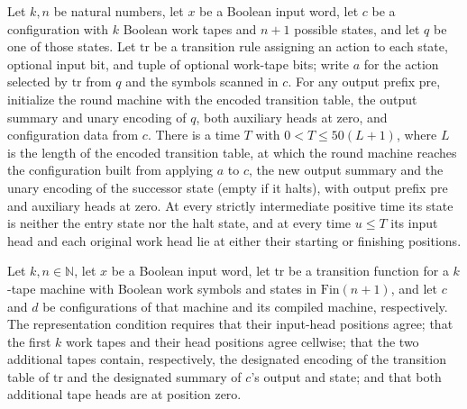 \begin{lemma}
\label{Turing.StepBlock.roundTM_canonical}
\leanok
{}
Let $k,n$ be natural numbers, let $x$ be a Boolean input word, let $c$ be a
configuration with $k$ Boolean work tapes and $n+1$ possible states, and let $q$ be one
of those states. Let $\mathrm{tr}$ be a transition rule assigning an action to each
state, optional input bit, and tuple of optional work-tape bits; write $a$ for the
action selected by $\mathrm{tr}$ from $q$ and the symbols scanned in $c$. For any output
prefix $\mathrm{pre}$, initialize the round machine with the encoded transition table,
the output summary and unary encoding of $q$, both auxiliary heads at zero, and
configuration data from $c$. There is a time $T$ with $0<T\le 50(L+1)$, where $L$ is the
length of the encoded transition table, at which the round machine reaches the
configuration built from applying $a$ to $c$, the new output summary and the unary
encoding of the successor state (empty if it halts), with output prefix $\mathrm{pre}$
and auxiliary heads at zero. At every strictly intermediate positive time its state is
neither the entry state nor the halt state, and at every time $u\le T$ its input head
and each original work head lie at either their starting or finishing positions.
\end{lemma}

\begin{definition}
\label{Turing.StepBlock.Rep}
\leanok
{}
Let $k,n\in\mathbb{N}$, let $x$ be a Boolean input word, let $\mathrm{tr}$ be a
transition function for a $k$-tape machine with Boolean work symbols and states in
$\text{Fin}(n+1)$, and let $c$ and $d$ be configurations of that machine and its
compiled machine, respectively. The representation condition requires that their
input-head positions agree; that the first $k$ work tapes and their head positions agree
cellwise; that the two additional tapes contain, respectively, the designated encoding
of the transition table of $\mathrm{tr}$ and the designated summary of $c$'s output and
state; and that both additional tape heads are at position zero.
\end{definition}


